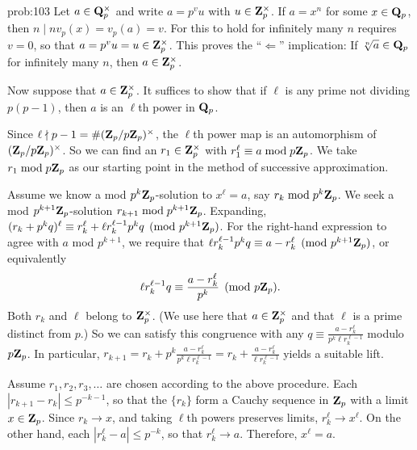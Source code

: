 \begin{sol}{prob:103} Let $a \in \mathbf{Q}_p^{\times}$ and write $a=p^{v} u$ with $u \in \mathbf{Z}_p^{\times}$. If $a=x^n$ for some $x \in \mathbf{Q}_p$, then $n \mid n v_p(x) = v_p(a) = v$. For this to hold for infinitely many $n$ requires $v=0$, so that $a=p^{v}u = u \in \mathbf{Z}_p^{\times}$. This proves the ``$\Longleftarrow$'' implication: If $\sqrt[n]{a} \in \mathbf{Q}_p$ for infinitely many $n$, then $a \in \mathbf{Z}_p^{\times}$.

Now suppose that $a \in \mathbf{Z}_p^{\times}$. It suffices to show that if $\ell$ is any prime not dividing $p(p-1)$, then $a$ is an $\ell$th power in $\mathbf{Q}_p$.

Since $\ell \nmid p-1 = \#(\mathbf{Z}_p/p\mathbf{Z}_p)^{\times}$, the $\ell$th power map is an automorphism of $(\mathbf{Z}_p/p\mathbf{Z}_p)^{\times}$. So we can find an $r_1 \in \mathbf{Z}_p^{\times}$ with $r_1^\ell \equiv a\bmod{p\mathbf{Z}_p}$. We take $r_1\bmod{p\mathbf{Z}_p}$ as our starting point in the method of successive approximation. 

Assume we know a mod $p^k\mathbf{Z}_p$-solution to $x^\ell=a$, say $r_k\bmod{p^k\mathbf{Z}_p}$. We seek a mod $p^{k+1}\mathbf{Z}_p$-solution $r_{k+1}\bmod{p^{k+1}\mathbf{Z}_p}$. Expanding, $(r_k+p^{k}q)^\ell \equiv r_k^\ell + \ell r_k^{\ell-1} p^{k} q \pmod{p^{k+1}\mathbf{Z}_p}$. For the right-hand expression to agree with $a$ mod $p^{k+1}$, we require that $\ell r_k^{\ell-1} p^k q \equiv a-r_k^\ell \pmod{p^{k+1}\mathbf{Z}_p}$, or equivalently
\[ \ell r_k^{\ell-1} q \equiv \frac{a-r_k^{\ell}}{p^k}\pmod{p\mathbf{Z}_p}.\]
Both $r_k$ and $\ell$ belong to $\mathbf{Z}_p^{\times}$. (We use here that $a\in \mathbf{Z}_p^{\times}$ and that $\ell$ is a prime distinct from $p$.) So we can satisfy this congruence with any $q\equiv \frac{a-r_k^{\ell}}{p^k \ell r_k^{\ell-1}}$ modulo $p\mathbf{Z}_p$. In particular, $r_{k+1} = r_k + p^k\frac{a-r_k^{\ell}}{p^k \ell r_k^{\ell-1}} = r_k + \frac{a-r_k^{\ell}}{\ell r_k^{\ell-1}}$ yields a suitable lift.

Assume $r_1,r_2,r_3,\dots$ are chosen according to the above procedure. Each $|r_{k+1}-r_k|\le p^{-k-1}$, so that the $\{r_k\}$ form a Cauchy sequence in $\mathbf{Z}_p$ with a limit $x \in \mathbf{Z}_p$. Since $r_k\to x$, and taking $\ell$th powers preserves limits, $r_k^{\ell}\to x^{\ell}$. On the other hand, each $|r_k^{\ell} -a|\le p^{-k}$, so that $r_k^{\ell}\to a$. Therefore, $x^{\ell}=a$.
\end{sol}

